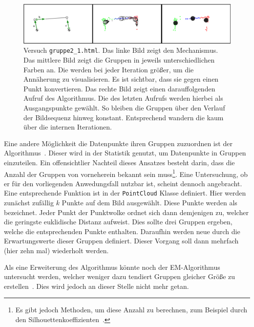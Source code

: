 \begin{figure}
    \centering
    \includegraphics[width=\textwidth]{gfx/k_means_centroids_edit.png}
    \caption[Versuch \lstinline{gruppe2_1.html}]{Versuch \lstinline{gruppe2_1.html}. Das linke Bild zeigt den Mechanismus. Das mittlere Bild zeigt die Gruppen in jeweils unterschiedlichen Farben an. Die  werden bei jeder Iteration grö{\ss}er, um die Annäherung zu visualisieren. Es ist sichtbar, dass sie gegen einen Punkt konvertieren. Das rechte Bild zeigt einen darauffolgenden Aufruf des Algorithmus. Die  des letzten Aufrufs werden hierbei als Ausgangspunkte gewählt. So bleiben die Gruppen über den Verlauf der Bildsequenz hinweg konstant. Entsprechend wandern die  kaum über die internen Iterationen.}
    \label{fig:gruppe2_1}
\end{figure}

Eine andere Möglichkeit die Datenpunkte ihren Gruppen zuzuordnen ist der  Algorithmus~\cite[S.~241]{Geron2019}.
Dieser wird in der Statistik genutzt, um Datenpunkte in Gruppen einzuteilen.
Ein offensichtlier Nachteil dieses Ansatzes besteht darin, dass die Anzahl der Gruppen von vorneherein bekannt sein muss\footnote{Es gibt jedoch Methoden, um diese Anzahl zu berechnen, zum Beispiel durch den Silhouettenkoeffizienten~\cite[S.~247]{Geron2019}.}.
Eine Untersuchung, ob er für den vorliegenden Anwedungsfall nutzbar ist, scheint dennoch angebracht.
Eine entsprechende Funktion ist in der \lstinline{PointCloud} Klasse definiert.
Hier werden zunächst zufällig $k$ Punkte auf dem Bild ausgewählt.
Diese Punkte werden als  bezeichnet.
Jeder Punkt der Punktwolke ordnet sich dann demjenigen  zu, welcher die geringste euklidische Distanz aufweist.
Dies sollte drei Gruppen ergeben, welche die entsprechenden Punkte enthalten.
Daraufhin werden neue  durch die Erwartungswerte dieser Gruppen definiert.
Dieser Vorgang soll dann mehrfach (hier zehn mal) wiederholt werden.

Als eine Erweiterung des  Algorithmus könnte noch der EM-Algorithmus untersucht werden, welcher weniger dazu tendiert Gruppen gleicher Grö{\ss}e zu erstellen~\cite[S.~262]{Geron2019}.
Dies wird jedoch an dieser Stelle nicht mehr getan.

